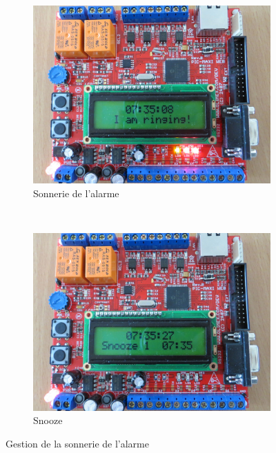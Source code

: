 \documentclass[12pt,a4paper]{article}
\begin{document}
\begin{figure}[!h]
        \centering
        \begin{subfigure}[b]{0.5\textwidth}
                \includegraphics[width=\textwidth]{photos/IMG_2160.JPG}
                \caption{Sonnerie de l'alarme}
                \label{fig:sonneriealarme}
        \end{subfigure}%
        ~ %
        \begin{subfigure}[b]{0.5\textwidth}
                \includegraphics[width=\textwidth]{photos/IMG_2162.JPG}
                \caption{Snooze}
                \label{fig:snoozealarme}
        \end{subfigure}
        \caption{Gestion de la sonnerie de l'alarme}
        \label{fig:sonneriealarme}
\end{figure}
\end{document}
